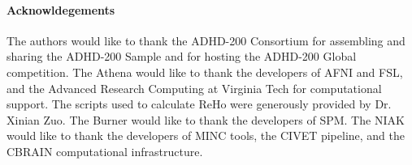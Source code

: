 \documentclass[preprint,12pt,3p]{elsarticle}
\begin{document}
\paragraph{Acknowldegements} The authors would like to thank the ADHD-200 Consortium for assembling and sharing the ADHD-200 Sample and for hosting the ADHD-200 Global competition. The Athena would like to thank the developers of AFNI and FSL, and the Advanced Research Computing at Virginia Tech for computational support. The scripts used to calculate ReHo were generously provided by Dr. Xinian Zuo. The Burner would like to thank the developers of SPM. The NIAK would like to thank the developers of MINC tools, the CIVET pipeline, and the CBRAIN computational infrastructure.


% 
% 
% 
% 
% 
% 
% 
% 
% 
% 
% 
% 

%

\end{document}
